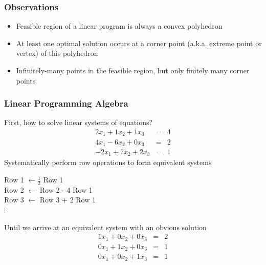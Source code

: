 \documentclass[12pt,handout]{beamer}
\begin{document}
\begin{frame}
\frametitle{Observations}
\begin{itemize}
\item Feasible region of a linear program is always a convex polyhedron
\item At least one optimal solution occurs at a corner point (a.k.a. extreme point or vertex) of this polyhedron
\item Infinitely-many points in the feasible region, but only finitely many corner points
\end{itemize}
\end{frame}

\begin{frame}
\frametitle{Linear Programming Algebra}
First, how to solve linear systems of equations?
\begin{eqnarray}
2 x_1 + 1 x_2 + 1 x_3 &=& 4 \nonumber \\
4 x_1 - 6 x_2 + 0 x_3 &=& 2 \nonumber \\
-2 x_1 + 7 x_2 + 2 x_3 &=& 1 \nonumber
\end{eqnarray}
Systematically perform row operations to form equivalent systems
\begin{center}
Row 1 $\leftarrow \frac{1}{2}$ Row 1 \\
Row 2 $\leftarrow$ Row 2 - 4 Row 1 \\
Row 3 $\leftarrow$ Row 3 + 2 Row 1 \\
$\vdots$ \\
\end{center}
Until we arrive at an equivalent system with an obvious solution
\begin{eqnarray}
1 x_1 + 0 x_2 + 0 x_3 &=& 2 \nonumber \\
0 x_1 + 1 x_2 + 0 x_3 &=& 1 \nonumber \\
0 x_1 + 0 x_2 + 1 x_3 &=& 1 \nonumber
\end{eqnarray}
\end{frame}
\end{document}
